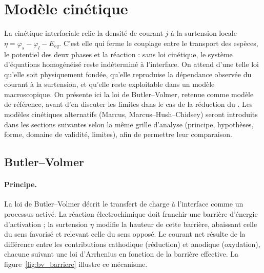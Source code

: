 
\section*{Modèle cinétique}

La cinétique interfaciale relie la densité de courant $j$ à la surtension
locale $\eta = \varphi_s - \varphi_l - E_{eq}$. C'est elle qui ferme le
couplage entre le transport des espèces, le potentiel des deux phases et la
réaction : sans loi cinétique, le système d'équations homogénéisé reste
indéterminé à l'interface. On attend d'une telle loi qu'elle soit
physiquement fondée, qu'elle reproduise la dépendance observée du courant à
la surtension, et qu'elle reste exploitable dans un modèle macroscopique. On
présente ici la loi de Butler--Volmer, retenue comme modèle de référence,
avant d'en discuter les limites dans le cas de la réduction du . Les
modèles cinétiques alternatifs (Marcus, Marcus--Hush--Chidsey) seront
introduits dans les sections suivantes selon la même grille d'analyse
(principe, hypothèses, forme, domaine de validité, limites), afin de
permettre leur comparaison.

\subsection*{Butler--Volmer}

\paragraph{Principe.}
La loi de Butler--Volmer décrit le transfert de charge à l'interface comme
un processus activé. La réaction électrochimique doit franchir une barrière
d'énergie d'activation ; la surtension $\eta$ modifie la hauteur de cette
barrière, abaissant celle du sens favorisé et relevant celle du sens opposé.
Le courant net résulte de la différence entre les contributions cathodique
(réduction) et anodique (oxydation), chacune suivant une loi d'Arrhenius en
fonction de la barrière effective. La figure~\ref{fig:bv_barriere} illustre
ce mécanisme.

